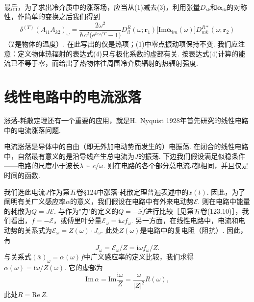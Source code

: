 \begin{xiti}
\begin{equation}
\begin{aligned}
\end{aligned}
\end{equation}
最后，为了求出冷介质中的涨落场，应当从(1)减去(3)，利用张量$D_{ik}$和$\bm{\alpha}_{ik}$的对称性，作简单的变换之后我们得到
\begin{equation}\tag{4}
\delta^{(T)}(A_{i1}A_{k2})_{\omega}=\frac{2\omega^{2}}{\hbar c^{2}\bigl(\mathrm{e}^{\hbar\omega/T}-1\bigr)}
D_{il}^{R}(\omega;\bm{r}_{1})\bigl[\mathrm{Im}\bm{\alpha}_{lm}(\omega)\bigr]D_{mk}^{R*}(\omega;\bm{r}_{2})
\end{equation}
（$T$是物体的温度）. 在此写出的仅是热项；(1)中零点振动项保持不变. 我们应注意：定义物体热辐射的表达式(4)只与极化系数的虚部有关. 按表达式(4)计算的能流已不等于零，而给出了热物体往周围冷介质辐射的热辐射强度.

\end{xiti}

\section{线性电路中的电流涨落}

涨落-耗散定理还有一个重要的应用，就是H.~Nyquist 1928年首先研究的线性电路中的电流涨落问题.

电流涨落是导体中的自由（即无外加电动势而发生的）电振荡. 在闭合的线性电路中，自然最有意义的是沿导线产生总电流为$J$的振荡. 下边我们假设满足似稳条件——电路的尺度小于波长$\lambda\sim c/\omega$. 则在电路的各个部分总电流$J$都相同，并且仅是时间的函数.

我们选此电流$J$作为第五卷§124中涨落-耗散定理普遍表述中的$x(t)$. 因此，为了阐明有关广义感应率$\alpha$的意义，我们假设在电路中有外来电动势$\mathcal{E}$. 则在电路中能量的耗散为$Q=J\mathcal{E}$. 与作为"力"的定义的$Q=-\bar{x}\dot{f}$进行比较［见第五卷(123.10)］，我们看出，$\dot{f}=-\mathcal{E}$，或傅里叶分量$\mathcal{E}_{\omega}=\mathrm{i}\omega f_{\omega}$. 另一方面，在线性电路中，电流和电动势的关系式为$\mathcal{E}_{\omega}=Z(\omega)\cdot J_{\omega}$. 此处$Z(\omega)$是电路中的复电阻（阻抗）. 因此，有
\begin{equation*}
J_{\omega}=\mathcal{E}_{\omega}/Z=\mathrm{i}\omega f_{\omega}/Z.
\end{equation*}
与关系式$(\bar{x})_{\omega}=\alpha(\omega)f$中广义感应率的定义比较，我们求得$\alpha(\omega)=\mathrm{i}\omega/Z(\omega)$. 它的虚部为
\begin{equation*}
\mathrm{Im}\,\alpha=\mathrm{Im}\frac{\mathrm{i}\omega}{Z}=\frac{\omega}{|Z|^{2}}R(\omega),
\end{equation*}
此处$R=\mathrm{Re}\,Z$.

